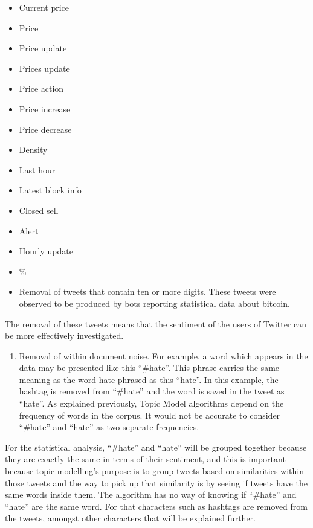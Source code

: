 \documentclass[
]{article}
\providecommand{\tightlist}{%
  \setlength{\itemsep}{0pt}\setlength{\parskip}{0pt}}
\begin{document}
\begin{itemize}
\tightlist
\item
  Current price
\item
  Price
\item
  Price update
\item
  Prices update
\item
  Price action
\item
  Price increase
\item
  Price decrease
\item
  Density
\item
  Last hour
\item
  Latest block info
\item
  Closed sell
\item
  Alert
\item
  Hourly update
\item
  \%
\item
  Removal of tweets that contain ten or more digits. These tweets were
  observed to be produced by bots reporting statistical data about
  bitcoin.
\end{itemize}

The removal of these tweets means that the sentiment of the users of
Twitter can be more effectively investigated.

\begin{enumerate}
\def\labelenumi{\arabic{enumi}.}
\setcounter{enumi}{1}
\tightlist
\item
  Removal of within document noise. For example, a word which appears in
  the data may be presented like this ``\#hate''. This phrase carries
  the same meaning as the word hate phrased as this ``hate''. In this
  example, the hashtag is removed from ``\#hate'' and the word is saved
  in the tweet as ``hate''. As explained previously, Topic Model
  algorithms depend on the frequency of words in the corpus. It would
  not be accurate to consider ``\#hate'' and ``hate'' as two separate
  frequencies.
\end{enumerate}

For the statistical analysis, ``\#hate'' and ``hate'' will be grouped
together because they are exactly the same in terms of their sentiment,
and this is important because topic modelling's purpose is to group
tweets based on similarities within those tweets and the way to pick up
that similarity is by seeing if tweets have the same words inside them.
The algorithm has no way of knowing if ``\#hate'' and ``hate'' are the
same word. For that characters such as hashtags are removed from the
tweets, amongst other characters that will be explained further.
\end{document}
